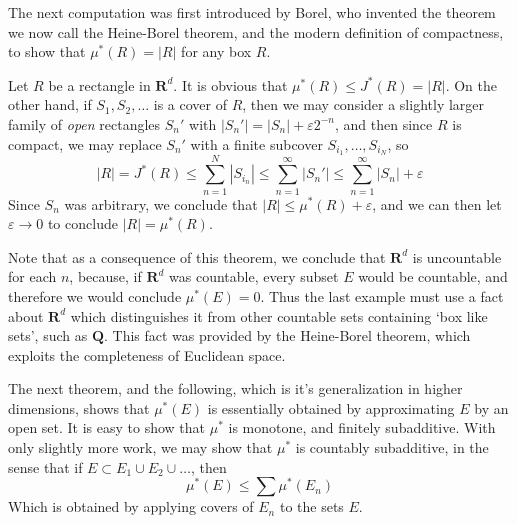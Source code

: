 The next computation was first introduced by Borel, who invented the theorem we now call the Heine-Borel theorem, and the modern definition of compactness, to show that $\mu^*(R) = |R|$ for any box $R$.

\begin{example}
  Let $R$ be a rectangle in $\mathbf{R}^d$. It is obvious that $\mu^*(R) \leq J^*(R) = |R|$. On the other hand, if $S_1, S_2, \dots$ is a cover of $R$, then we may consider a slightly larger family of {\it open} rectangles $S_n'$ with $|S_n'| = |S_n| + \varepsilon 2^{-n}$, and then since $R$ is compact, we may replace $S_n'$ with a finite subcover $S_{i_1}, \dots, S_{i_N}$, so
  \[ |R| = J^*(R) \leq \sum_{n = 1}^N |S_{i_n}| \leq \sum_{n=1}^\infty |S_n'| \leq \sum_{n = 1}^\infty |S_n| + \varepsilon \]
  Since $S_n$ was arbitrary, we conclude that $|R| \leq \mu^*(R) + \varepsilon$, and we can then let $\varepsilon \to 0$ to conclude $|R| = \mu^*(R)$.
\end{example}

\begin{remark}
  Note that as a consequence of this theorem, we conclude that $\mathbf{R}^d$ is uncountable for each $n$, because, if $\mathbf{R}^d$ was countable, every subset $E$ would be countable, and therefore we would conclude $\mu^*(E) = 0$. Thus the last example must use a fact about $\mathbf{R}^d$ which distinguishes it from other countable sets containing `box like sets', such as $\mathbf{Q}$. This fact was provided by the Heine-Borel theorem, which exploits the completeness of Euclidean space.
\end{remark}

The next theorem, and the following, which is it's generalization in higher dimensions, shows that $\mu^*(E)$ is essentially obtained by approximating $E$ by an open set. It is easy to show that $\mu^*$ is monotone, and finitely subadditive. With only slightly more work, we may show that $\mu^*$ is countably subadditive, in the sense that if $E \subset E_1 \cup E_2 \cup \dots$, then
%
\[ \mu^*(E) \leq \sum \mu^*(E_n) \]
%
Which is obtained by applying covers of $E_n$ to the sets $E$.

